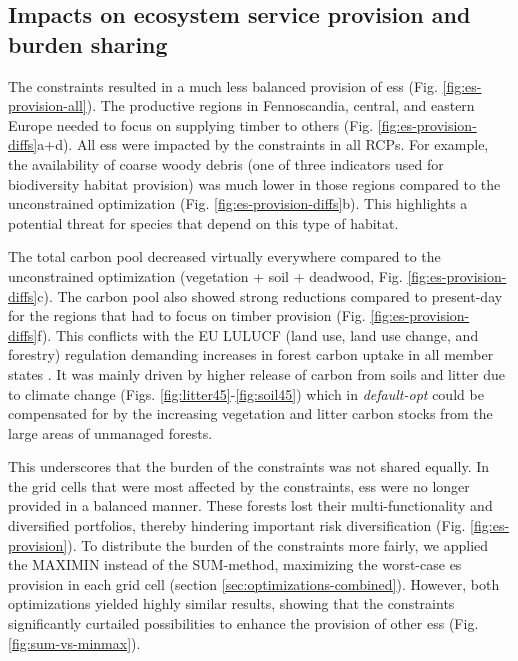 \documentclass[]{article}
\begin{document}
\subsection{Impacts on ecosystem service provision and burden sharing}\label{sec:sum-and-maximin}

The constraints resulted in a much less balanced provision of \glspl{es} (Fig. \ref{fig:es-provision-all}). The productive regions in Fennoscandia, central, and eastern Europe needed to focus on supplying timber to others (Fig. \ref{fig:es-provision-diffs}a+d). 
All \glspl{es} were impacted by the constraints in all RCPs. For example, the availability of coarse woody debris (one of three indicators used for biodiversity habitat provision) was much lower in those regions compared to the unconstrained optimization (Fig. \ref{fig:es-provision-diffs}b). This highlights a potential threat for species that depend on this type of habitat.

The total carbon pool decreased virtually everywhere compared to the unconstrained optimization (vegetation + soil + deadwood, Fig. \ref{fig:es-provision-diffs}c). The carbon pool also showed strong reductions compared to present-day for the regions that had to focus on timber provision (Fig. \ref{fig:es-provision-diffs}f). 
This conflicts with the EU LULUCF (land use, land use change, and forestry) regulation demanding increases in forest carbon uptake in all member states \parencite{EU2018LULUCF}.
It was mainly driven by higher release of carbon from soils and litter due to climate change (Figs. \ref{fig:litter45}-\ref{fig:soil45}) which in \textit{default-opt} could be compensated for by the increasing vegetation and litter carbon stocks from the large areas of unmanaged forests.

This underscores that the burden of the constraints was not shared equally. In the grid cells that were most affected by the constraints, \glspl{es} were no longer provided in a balanced manner. These forests lost their multi-functionality and diversified portfolios, thereby hindering important risk diversification (Fig. \ref{fig:es-provision}).
To distribute the burden of the constraints more fairly, we applied the MAXIMIN instead of the SUM-method, maximizing the worst-case \gls{es} provision in each grid cell (section \ref{sec:optimizations-combined}). However, both optimizations yielded highly similar results, showing that the constraints significantly curtailed possibilities to enhance the provision of other \glspl{es} (Fig. \ref{fig:sum-vs-minmax}).
\end{document}
